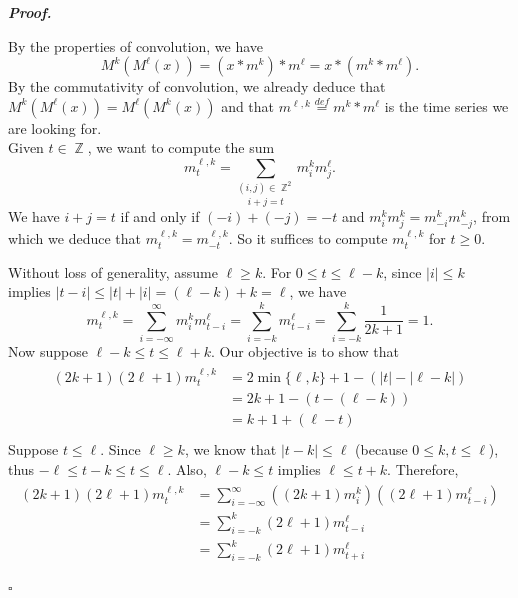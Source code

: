 \documentclass[11 pt]{article}
\newcommand{\1}{\operatorname{\mathbb I}}
\newcommand{\Z}{\operatorname{\mathbb Z}}
\newcommand{\defn}{\overset{def}{=}}
\newcounter{env} %
\renewenvironment{proof}
{\par
	\begin{mdframed}[skipabove=12 pt,bottomline=false,topline=false,rightline=false]%
	\noindent \textit{\textbf{Proof.}} 
}
{%
	\end{mdframed}\par
	\begin{flushright} \vspace{-35 pt} $\square$ \end{flushright}
	\vspace{-20 pt}
}
\begin{document}
\begin{proof}
    By the properties of convolution, we have
    \[
        M^k(M^{\ell}(x)) = (x * m^k) * m^{\ell} = x * (m^k * m^{\ell}).
    \]
    By the commutativity of convolution, we already deduce that $M^k(M^{\ell}(x)) = M^{\ell}(M^k(x))$ and that $m^{\ell,k} \defn m^k * m^{\ell}$ is the time series we are looking for. \\

    Given $t \in \Z$, we want to compute the sum 
    \[
        m^{\ell,k}_t = \underset{i+j = t}{\sum_{(i,j) \in \Z^2}} m_i^k m_j^{\ell}.
    \]
    We have $i+j = t$ if and only if $(-i) + (-j) = -t$ and $m_i^k m_j^k = m_{-i}^k m_{-j}^k$, from which we deduce that $m^{\ell,k}_t = m^{\ell,k}_{-t}$. So it suffices to compute $m^{\ell,k}_t$ for $t \ge 0$. 

    Without loss of generality, assume $\ell \ge k$. For $0 \le t \le \ell - k$, since $|i| \le k$ implies $|t-i| \le |t| + |i| = (\ell -k) + k = \ell$, we have
    \[
        m^{\ell,k}_t = \sum_{i=-\infty}^{\infty} m_i^k m_{t-i}^{\ell} = \sum_{i=-k}^k m_{t-i}^{\ell} =\sum_{i=-k}^k \frac 1{2k+1} = 1.
    \]
    Now suppose $\ell - k \le t \le \ell + k$. Our objective is to show that
    \begin{gather*}
        \begin{aligned}
            (2k+1)(2\ell+1) m^{\ell,k}_t 
                & = 2 \min\{\ell,k\} + 1 - (|t| - |\ell - k|)   \\
                & = 2k + 1 - (t - (\ell - k))                   \\
                & = k + 1 + (\ell - t)                          \\
        \end{aligned}
    \end{gather*}
    Suppose $t \le \ell$. Since $\ell \ge k$, we know that $|t - k| \le \ell$ (because $0 \le k,t \le \ell$), thus $-\ell \le t-k \le t \le \ell$. Also, $\ell - k \le t$ implies $\ell \le t+k$. Therefore,
    \begin{gather*}
        \begin{aligned}
        (2k+1)(2\ell+1) m^{\ell,k}_t 
            & = \sum_{i=-\infty}^{\infty} ((2k+1) m_i^k) ((2\ell+1)m_{t-i}^{\ell})                \\
            & = \sum_{i=-k}^k (2\ell+1) m_{t-i}^{\ell}                                            \\
            & = \sum_{i=-k}^k (2\ell+1)m_{t+i}^{\ell}                                             \\

\end{aligned}
\end{gather*}
\end{proof}
\end{document}
